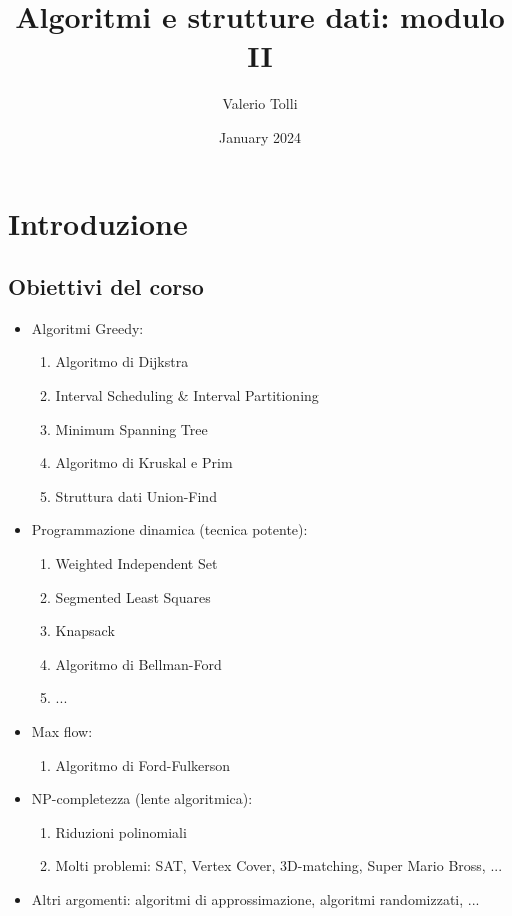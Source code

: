 \documentclass{article}
\title{Algoritmi e strutture dati: modulo II}
\author{Valerio Tolli}
\date{January 2024}
\begin{document}
\maketitle
\newpage
\tableofcontents
\newpage
\section{Introduzione}
\subsection{Obiettivi del corso}
\begin{itemize}
    \item Algoritmi Greedy:
    \begin{enumerate}
        \item Algoritmo di Dijkstra
        \item Interval Scheduling \& Interval Partitioning
        \item Minimum Spanning Tree
        \item Algoritmo di Kruskal e Prim
        \item Struttura dati Union-Find
    \end{enumerate}
    \item Programmazione dinamica (tecnica potente):
    \begin{enumerate}
        \item Weighted Independent Set
        \item Segmented Least Squares
        \item Knapsack
        \item Algoritmo di Bellman-Ford
        \item ...
    \end{enumerate}
    \item Max flow:
    \begin{enumerate}
        \item Algoritmo di Ford-Fulkerson
    \end{enumerate}
    \item NP-completezza (lente algoritmica):
    \begin{enumerate}
        \item Riduzioni polinomiali
        \item Molti problemi: SAT, Vertex Cover, 3D-matching, Super Mario Bross, ...
    \end{enumerate}
    \item Altri argomenti: algoritmi di approssimazione, algoritmi randomizzati, ...
\end{itemize}
\newpage
\end{document}
